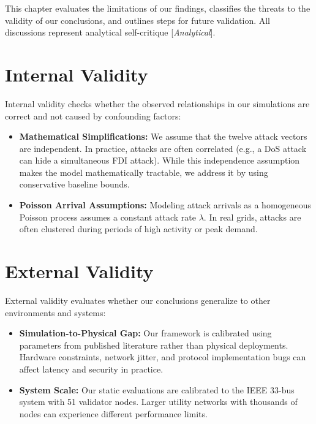 \documentclass[12pt, oneside, a4paper]{report}
\theoremstyle{definition}
\theoremstyle{remark}
\newcommand{\analytical}{[\textit{Analytical}]}
\begin{document}
This chapter evaluates the limitations of our findings, classifies the threats to the validity of our conclusions, and outlines steps for future validation. All discussions represent analytical self-critique \analytical.

\section{Internal Validity}
\label{sec:tv:internal}
Internal validity checks whether the observed relationships in our simulations are correct and not caused by confounding factors:
\begin{itemize}
  \item \textbf{Mathematical Simplifications:} We assume that the twelve attack vectors are independent. In practice, attacks are often correlated (e.g., a DoS attack can hide a simultaneous FDI attack). While this independence assumption makes the model mathematically tractable, we address it by using conservative baseline bounds.
  \item \textbf{Poisson Arrival Assumptions:} Modeling attack arrivals as a homogeneous Poisson process assumes a constant attack rate $\lambda$. In real grids, attacks are often clustered during periods of high activity or peak demand.
\end{itemize}

\section{External Validity}
\label{sec:tv:external}
External validity evaluates whether our conclusions generalize to other environments and systems:
\begin{itemize}
  \item \textbf{Simulation-to-Physical Gap:} Our framework is calibrated using parameters from published literature rather than physical deployments. Hardware constraints, network jitter, and protocol implementation bugs can affect latency and security in practice.
  \item \textbf{System Scale:} Our static evaluations are calibrated to the IEEE 33-bus system with 51 validator nodes. Larger utility networks with thousands of nodes can experience different performance limits.
\end{itemize}
\end{document}
